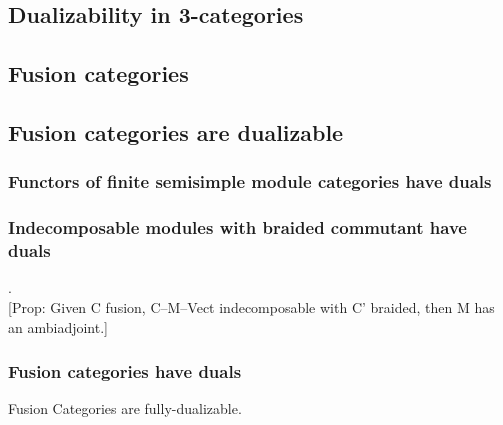 \documentclass{amsart}
\begin{document}
\subsection{Dualizability in 3-categories}

\subsection{Fusion categories}

\subsection{Fusion categories are dualizable}

\subsubsection{Functors of finite semisimple module categories have duals}

\subsubsection{Indecomposable modules with braided commutant have duals} .\\

	[Prop: Given C fusion, C--M--Vect indecomposable with C' braided, then M has an ambiadjoint.]

\subsubsection{Fusion categories have duals}

\begin{theorem}
	Fusion Categories are fully-dualizable. 
\end{theorem}
	
\end{document}
